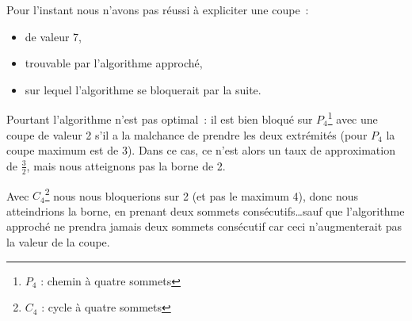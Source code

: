 Pour l'instant nous n'avons pas réussi à expliciter une coupe~:

\begin{itemize}
\item de valeur 7,
\item trouvable par l'algorithme approché,
\item sur lequel l'algorithme se bloquerait par la suite.
\end{itemize}

Pourtant l'algorithme n'est pas optimal~: il est bien bloqué sur
$P_4$\footnote{$P_4$ : chemin à quatre sommets} avec une coupe de valeur 2 s'il a la malchance de prendre les deux extrémités (pour $P_4$ la coupe maximum est de 3). Dans ce cas, ce n'est alors un taux
de approximation de $\frac{3}{2}$, mais nous atteignons pas la borne de 2. 

Avec $C_4$\footnote{$C_4$ : cycle à quatre sommets} nous nous bloquerions sur 2 (et pas le maximum 4), donc nous atteindrions la borne, en prenant deux sommets consécutifs\dots sauf que l'algorithme approché ne prendra jamais deux sommets consécutif car ceci n'augmenterait pas la valeur de la coupe.
